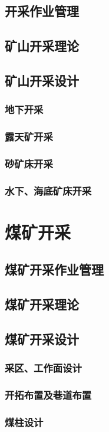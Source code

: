 \documentclass[UTF8]{../../ApplicationUniverse}
\begin{document}
    \subsection{开采作业管理}
    \subsection{矿山开采理论}
    \subsection{矿山开采设计}
        \subsubsection{地下开采}
        \subsubsection{露天矿开采}
        \subsubsection{砂矿床开采}
        \subsubsection{水下、海底矿床开采}
\section{煤矿开采}
    \subsection{煤矿开采作业管理}
    \subsection{煤矿开采理论}
    \subsection{煤矿开采设计}
        \subsubsection{采区、工作面设计}
        \subsubsection{开拓布置及巷道布置}
        \subsubsection{煤柱设计}
\end{document}
